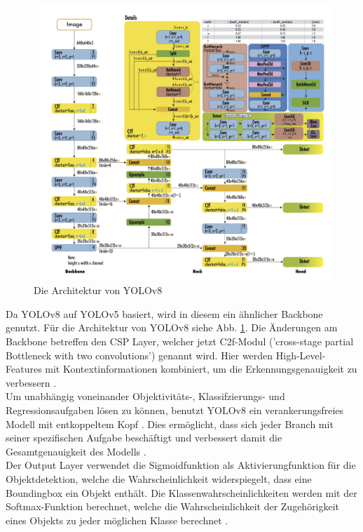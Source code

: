 {{\begin{figure}[h]
		\includegraphics*[scale = 0.35, keepaspectratio]{images/YOLO/YOLOv8_Arch.png}
		\caption[Die Architektur von YOLOv8]{Die Architektur von YOLOv8 \citep{Terven2023}}
		\label{YOLOv8_Arch}
	\end{figure}Da YOLOv8 auf YOLOv5 basiert, wird in diesem ein ähnlicher Backbone genutzt. Für die Architektur von YOLOv8 siehe Abb. \ref{YOLOv8_Arch}. Die Änderungen am Backbone betreffen den CSP Layer, welcher jetzt C2f-Modul ('cross-stage partial Bottleneck with two convolutions') genannt wird. Hier werden High-Level-Features mit Kontextinformationen kombiniert, um die Erkennungsgenauigkeit zu verbessern \citep{Terven2023}. \\
	Um unabhängig voneinander Objektivitäts-, Klassifzierungs- und Regressionsaufgaben lösen zu können, benutzt YOLOv8 ein verankerungsfreies Modell mit entkoppeltem Kopf . Dies ermöglicht, dass sich jeder Branch mit seiner spezifischen Aufgabe beschäftigt und verbessert damit die Gesamtgenauigkeit des Modells \citep{Terven2023}. \\
	Der Output Layer verwendet die Sigmoidfunktion als Aktivierungfunktion für die Objektdetektion, welche die Wahrscheinlichkeit widerspiegelt, dass eine Boundingbox ein Objekt enthält. Die Klassenwahrscheinlichkeiten werden mit der Softmax-Funktion berechnet, welche die Wahrscheinlichkeit der Zugehörigkeit eines Objekts zu jeder möglichen Klasse berechnet \citep{Terven2023}. \\

}}
